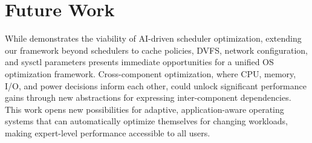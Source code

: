 \section{Future Work}
\label{sec:future}

While \sys demonstrates the viability of AI-driven scheduler optimization, extending our framework beyond schedulers to cache policies, DVFS, network configuration, and sysctl parameters presents immediate opportunities for a unified OS optimization framework. Cross-component optimization, where CPU, memory, I/O, and power decisions inform each other, could unlock significant performance gains through new abstractions for expressing inter-component dependencies. This work opens new possibilities for adaptive, application-aware operating systems that can automatically optimize themselves for changing workloads, making expert-level performance accessible to all users.